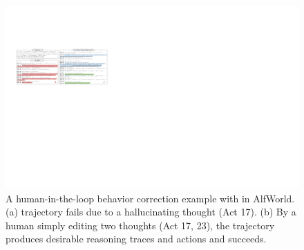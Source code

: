 \begin{figure}[ht]
    \centering
    \includegraphics[width=\textwidth]{iclr2023/figure/human_edit.pdf}
    \caption{
    A human-in-the-loop behavior correction example with \model{} in AlfWorld. 
    (a) \model{} trajectory fails due to a hallucinating thought (Act 17).
    (b) By a human simply editing two thoughts (Act 17, 23), the \model{} trajectory produces desirable reasoning traces and actions and succeeds.
    }
    \label{fig:edit}
    \vspace{-10pt}
\end{figure}
